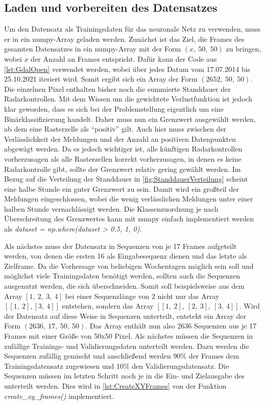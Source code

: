 \subsection{Laden und vorbereiten des Datensatzes}
\label{sec:DatensatzLaden}
Um den Datensatz als Trainingsdaten für das neuronale Netz zu verwenden, muss er in ein numpy-Array geladen werden.
Zunächst ist das Ziel, die Frames des gesamten Datensatzes in ein numpy-Array mit der Form $(x,~50,~50)$ zu bringen, wobei $x$ der Anzahl an Frames entspricht.
Dafür kann der Code aus \autoref{lst:GdalOpen} verwendet werden, wobei über jedes Datum vom 17.07.2014 bis 25.10.2021 iteriert wird.
Somit ergibt sich ein Array der Form $(2652,~50,~50)$.
Die einzelnen Pixel enthalten bisher noch die summierte Standdauer der Radarkontrollen.
Mit dem Wissen um die gewichtete Verlustfunktion ist jedoch klar geworden, dass es sich bei der Problemstellung eigentlich um eine Binärklassifizierung handelt.
Daher muss nun ein Grenzwert ausgewählt werden, ab dem eine Rasterzelle als "`positiv"' gilt.
Auch hier muss zwischen der Verlässlichkeit der Meldungen und der Anzahl an positiven Datenpunkten abgewägt werden.
Da es jedoch wichtiger ist, alle künftigen Radarkontrollen vorherzusagen als alle Rasterzellen korrekt vorherzusagen, in denen es keine Radarkontrolle gibt, sollte der Grenzwert relativ gering gewählt werden.
Im Bezug auf die Verteilung der Standdauer in \autoref{fig:StanddauerVerteilung} scheint eine halbe Stunde ein guter Grenzwert zu sein.
Damit wird ein großteil der Meldungen eingeschlossen, wobei die wenig verlässlichen Meldungen unter einer halben Stunde vernachlässigt werden.
Die Klassenzuordnung je nach Überschreitung des Grenzwertes kann mit numpy einfach implementiert werden als \emph{dataset = np.where(dataset > 0.5, 1, 0)}.

Als nächstes muss der Datensatz in Sequenzen von je 17 Frames aufgeteilt werden, von denen die ersten 16 als Eingabesequenz dienen und das letzte als Zielframe.
Da die Vorhersage von beliebigen Wochentagen möglich sein soll und möglichst viele Trainingsdaten benötigt werden, sollten auch die Sequenzen ausgenutzt werden, die sich überschneiden.
Somit soll beispielsweise aus dem Array $[1,~2,~3,~4]$ bei einer Sequenzlänge von $2$ nicht nur das Array $[[1,~2], [3,~4]]$ entstehen, sondern das Array $[[1,~2],~[2,~3],~[3,~4]]$.
Wird der Datensatz auf diese Weise in Sequenzen unterteilt, entsteht ein Array der Form $(2636,~17,~50,~50)$.
Das Array enthält nun also 2636 Sequenzen aus je 17 Frames mit einer Größe von 50x50 Pixel.
Als nächstes müssen die Sequenzen in zufällige Trainings- und Validierungsdaten unterteilt werden.
Dazu werden die Sequenzen zufällig gemischt und anschließend werden 90\% der Frames dem Trainingsdatensatz zugewiesen und 10\% den Validierungsdatensatz.
Die Sequenzen müssen im letzten Schritt noch je in die Ein- und Zielausgabe des  unterteilt werden.
Dies wird in \autoref{lst:CreateXYFrames} von der Funktion \emph{create\_xy\_frames()} implementiert.

